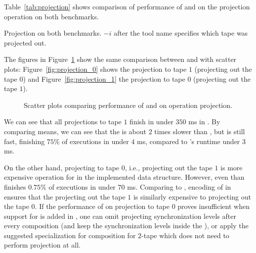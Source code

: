 Table~\ref{tab:projection} shows comparison of performance of \mata and \mona on the projection operation on both benchmarks.

\begin{table}[ht]
  \centering
  
  \caption{
    Projection on both benchmarks. $-i$ after the tool name specifies which tape was projected out.
  }
  \label{tab:projection}
\end{table}

The figures in Figure~\ref{fig:projection} show the same comparison between \mata and \mona with scatter plots: Figure~\ref{fig:projection_0} shows the projection to tape $1$ (projecting out the tape $0$) and Figure~\ref{fig:projection_1} the projection to tape $0$ (projecting out the tape $1$).

\begin{figure}[ht]
    \centering
    \quad
    \caption{
      Scatter plots comparing performance of \mata and \mona on operation projection.
    }
    \label{fig:projection}%
\end{figure}

We can see that all projections to tape $1$ finish in under $350$ ms in \mata.
By comparing means, we can see that the \mata is about 2 times slower than \mona, but is still fast, finishing $75\%$ of executions in under $4$ ms, compared to \mona's runtime under $3$ ms.

On the other hand, projecting to tape $0$, i.e., projecting out the tape $1$ is more expensive operation for \mata in the implemented data structure.
However, even than \mata finishes $0.75\%$ of executions in under $70$ ms.
Comparing to \mona, encoding of \nfts in \mona ensures that the projecting out the tape $1$ is similarly expensive to projecting out the tape $0$.
If the performance of \mata on projection to tape $0$ proves insufficient when support for \nfts is added in \noodler, one can omit projecting synchronization levels after every composition (and keep the synchronization levels inside the \nft), or apply the suggested specialization for composition for $2$-tape \nfts which does not need to perform projection at all.

